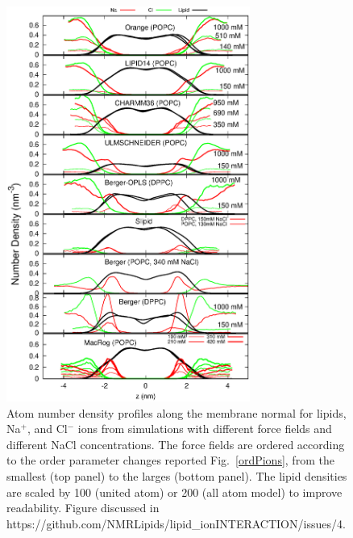 \documentclass[pre,aps,floatfix,authordate1-4,twocolumn]{revtex4-1}
\begin{document}
\begin{figure}[]
  \centering
  \includegraphics[width=8cm]{../Fig/NAdensities.eps}
  \caption{\label{NAdensities}
    Atom number density profiles along the membrane normal for lipids, Na$^+$, and Cl$^-$ ions 
    from simulations with different force fields and different NaCl concentrations. 
    The force fields are ordered according to the order parameter changes 
    reported Fig.~\ref{ordPions}, from the smallest (top panel) to the larges (bottom panel).
    The lipid densities are scaled by 100 (united atom) or 200 (all atom model) to improve readability. 
    Figure discussed in https://github.com/NMRLipids/lipid\_ionINTERACTION/issues/4.}
\end{figure}
\end{document}
